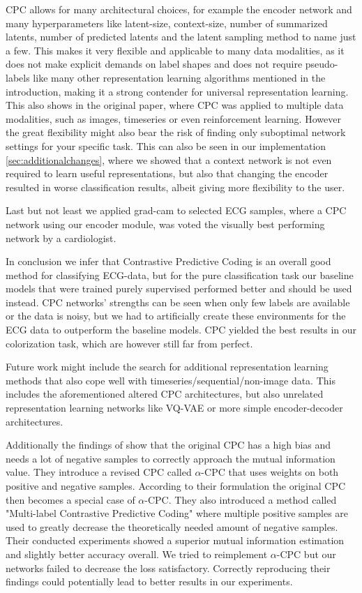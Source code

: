 CPC allows for many architectural choices, for example the encoder network and many hyperparameters like latent-size, context-size, number of summarized latents, number of predicted latents and the latent sampling method to name just a few. This makes it very flexible and applicable to many data modalities, as it does not make explicit demands on label shapes and does not require pseudo-labels like many other representation learning algorithms mentioned in the introduction, making it a strong contender for universal representation learning. This also shows in the original paper, where CPC was applied to multiple data modalities, such as images, timeseries or even reinforcement learning\autocite{DBLP:journals/corr/abs-1807-03748}. However the great flexibility might also bear the risk of finding only suboptimal network settings for your specific task. This can also be seen in our implementation \autoref{sec:additionalchanges}, where we showed that a context network is not even required to learn useful representations, but also that changing the encoder resulted in worse classification results, albeit giving more flexibility to the user.

Last but not least we applied grad-cam \autocite{DBLP:journals/corr/SelvarajuDVCPB16} to selected ECG samples, where a CPC network using our  encoder module, was voted the visually best performing network by a cardiologist.

In conclusion we infer that Contrastive Predictive Coding is an overall good method for classifying ECG-data, but for the pure classification task our baseline models that were trained purely supervised performed better and should be used instead. CPC networks' strengths can be seen when only few labels are available or the data is noisy, but we had to artificially create these environments for the ECG data to outperform the baseline models. CPC yielded the best results in our colorization task, which are however still far from perfect.

Future work might include the search for additional representation learning methods that also cope well with timeseries/sequential/non-image data. This includes the aforementioned altered CPC architectures, but also unrelated representation learning networks like VQ-VAE or more simple encoder-decoder architectures.

Additionally the findings of \autocite{song2020multilabelcontrastive} show that the original CPC has a high bias and needs a lot of negative samples to correctly approach the mutual information value. They introduce a revised CPC called $\alpha$-CPC that uses weights on both positive and negative samples. According to their formulation the original CPC then becomes a special case of $\alpha$-CPC. They also introduced a method called "Multi-label Contrastive Predictive Coding" where multiple positive samples are used to greatly decrease the theoretically needed amount of negative samples. Their conducted experiments showed a superior mutual information estimation and slightly better accuracy overall. We tried to reimplement $\alpha$-CPC but our networks failed to decrease the loss satisfactory. Correctly reproducing their findings could potentially lead to better results in our experiments. 
